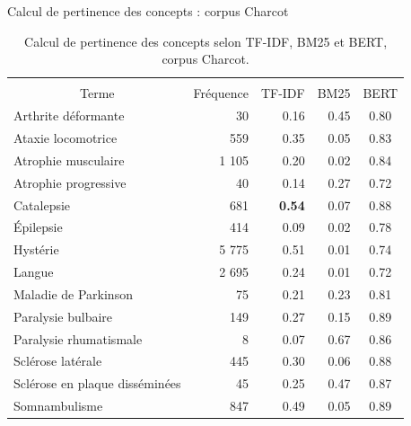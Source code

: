 \begin{frame}{Calcul de pertinence des concepts : corpus \og{}Charcot\fg{}}
\footnotesize
\begin{table}[]
\begin{tabular}{|l|cccc|}
\hline
\multicolumn{1}{|c|}{{ }} &
  \multicolumn{4}{c|}{\cellcolor[HTML]{FCFF2F}{ Corpus \og{}Charcot\fg{}}} \\ \cline{2-5} 
\multicolumn{1}{|c|}{\multirow{}{}{{Terme}}} &
  {Fréquence} &
  {TF-IDF} &
  {BM25} &
  {BERT} \\ \hline
{Arthrite déformante} &
  \multicolumn{1}{|r|}{{30}} &
  \multicolumn{1}{|r|}{{0.16}} &
  \multicolumn{1}{|r|}{{0.45}} &
  {0.80} \\ \hline
{Ataxie locomotrice} &
  \multicolumn{1}{|r|}{{559}} &
  \multicolumn{1}{|r|}{{0.35}} &
  \multicolumn{1}{|r|}{{0.05}} &
  {0.83} \\ \hline
{Atrophie musculaire} &
  \multicolumn{1}{|r|}{{1 105}} &
  \multicolumn{1}{|r|}{{0.20}} &
  \multicolumn{1}{|r|}{{0.02}} &
  {0.84} \\ \hline
{Atrophie progressive} &
  \multicolumn{1}{|r|}{{40}} &
  \multicolumn{1}{|r|}{{0.14}} &
  \multicolumn{1}{|r|}{{0.27}} &
  {0.72} \\ \hline
{Catalepsie} &
  \multicolumn{1}{|r|}{{681}} &
  \multicolumn{1}{|r|}{{\textbf{0.54}}} &
  \multicolumn{1}{|r|}{{0.07}} &
  {0.88} \\ \hline
{Épilepsie} &
  \multicolumn{1}{|r|}{{414}} &
  \multicolumn{1}{|r|}{{0.09}} &
  \multicolumn{1}{|r|}{{0.02}} &
  {0.78} \\ \hline
{Hystérie} &
  \multicolumn{1}{|r|}{{5 775}} &
  \multicolumn{1}{|r|}{{0.51}} &
  \multicolumn{1}{|r|}{{0.01}} &
  {0.74} \\ \hline
{Langue} &
  \multicolumn{1}{|r|}{{2 695}} &
  \multicolumn{1}{|r|}{{0.24}} &
  \multicolumn{1}{|r|}{{0.01}} &
  {0.72} \\ \hline
{Maladie de Parkinson} &
  \multicolumn{1}{|r|}{{75}} &
  \multicolumn{1}{|r|}{{0.21}} &
  \multicolumn{1}{|r|}{{0.23}} &
  {0.81} \\ \hline
{Paralysie bulbaire} &
  \multicolumn{1}{|r|}{{149}} &
  \multicolumn{1}{|r|}{{0.27}} &
  \multicolumn{1}{|r|}{{0.15}} &
  {0.89} \\ \hline
{Paralysie rhumatismale} &
  \multicolumn{1}{|r|}{{8}} &
  \multicolumn{1}{|r|}{{0.07}} &
  \multicolumn{1}{|r|}{{0.67}} &
  {0.86} \\ \hline
{Sclérose latérale} &
  \multicolumn{1}{|r|}{{445}} &
  \multicolumn{1}{|r|}{{0.30}} &
  \multicolumn{1}{|r|}{{0.06}} &
  {0.88} \\ \hline
{Sclérose en plaque disséminées} &
  \multicolumn{1}{|r|}{{45}} &
  \multicolumn{1}{|r|}{{0.25}} &
  \multicolumn{1}{|r|}{{0.47}} &
  {0.87} \\ \hline
{Somnambulisme} &
  \multicolumn{1}{|r|}{{847}} &
  \multicolumn{1}{|r|}{{0.49}} &
  \multicolumn{1}{|r|}{{0.05}} &
  {0.89} \\ \hline
\end{tabular}
\caption{Calcul de pertinence des concepts selon TF-IDF, BM25 et BERT, corpus \og{}Charcot\fg{}.}
\end{table}
\end{frame}

